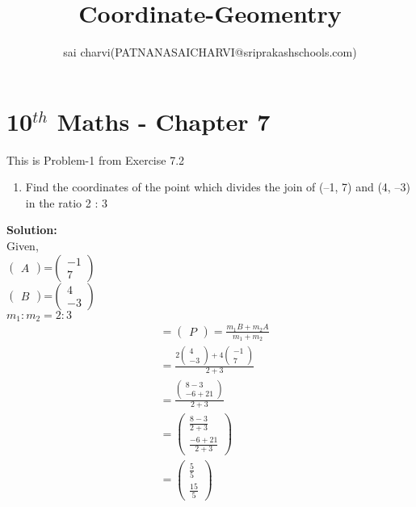 \documentclass[12pt]{article}
\title{Coordinate-Geomentry}
\author{sai charvi(PATNANASAICHARVI@sriprakashschools.com)}
\newcommand{\myvec}[1]{\ensuremath{\begin{pmatrix}#1\end{pmatrix}}}
\newcommand{\solution}{\noindent \textbf{Solution: }}
\begin{document}
\maketitle
\section*{10$^{th}$ Maths - Chapter 7}
This is Problem-1 from Exercise 7.2
\begin{enumerate}
\item Find the coordinates of the point which divides the join of (–1, 7) and (4, –3) in the
ratio 2 : 3\\
\end{enumerate}
\solution \\
Given,\\
$\myvec{A}$=\myvec{-1\\7}\\
$\myvec{B}$=\myvec{4\\-3}\\
$m_1:m_2=2:3$
\begin{align}
&=\myvec{P}=\frac{m_1B+m_2A}{m_1+m_2}\\
&=\frac{2\myvec{4\\-3}+4\myvec{-1\\7}}{2+3}\\
&=\frac{\myvec{8-3\\-6+21}}{2+3}\\
&=\myvec{\frac{8-3}{2+3}\\\frac{-6+21}{2+3}}\\
&=\myvec{\frac{5}{5}\\\frac{15}{5}}
\end{align}
\end{document}
